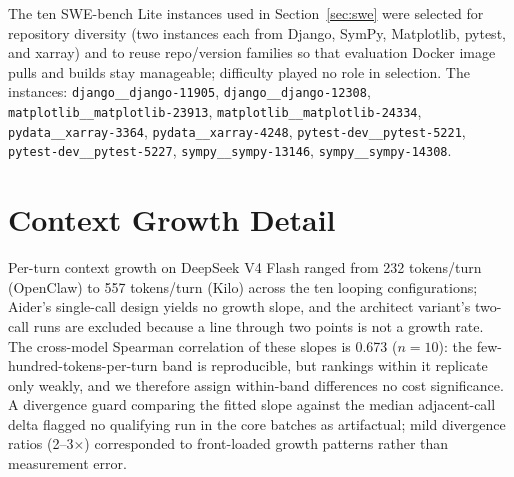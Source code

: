 \documentclass[11pt]{article}
\newcommand{\harness}[1]{\textsf{#1}}
\begin{document}
The ten SWE-bench Lite instances used in Section~\ref{sec:swe} were selected for repository diversity (two instances each from Django, SymPy, Matplotlib, pytest, and xarray) and to reuse repo/version families so that evaluation Docker image pulls and builds stay manageable; difficulty played no role in selection. The instances: \texttt{django\_\_django-11905}, \texttt{django\_\_django-12308}, \texttt{matplotlib\_\_matplotlib-23913}, \texttt{matplotlib\_\_matplotlib-24334}, \texttt{pydata\_\_xarray-3364}, \texttt{pydata\_\_xarray-4248}, \texttt{pytest-dev\_\_pytest-5221}, \texttt{pytest-dev\_\_pytest-5227}, \texttt{sympy\_\_sympy-13146}, \texttt{sympy\_\_sympy-14308}.

\section{Context Growth Detail}
\label{app:growth}

Per-turn context growth on DeepSeek V4 Flash ranged from 232 tokens/turn (\harness{OpenClaw}) to 557 tokens/turn (\harness{Kilo}) across the ten looping configurations; \harness{Aider}'s single-call design yields no growth slope, and the architect variant's two-call runs are excluded because a line through two points is not a growth rate. The cross-model Spearman correlation of these slopes is 0.673 ($n = 10$): the few-hundred-tokens-per-turn band is reproducible, but rankings within it replicate only weakly, and we therefore assign within-band differences no cost significance. A divergence guard comparing the fitted slope against the median adjacent-call delta flagged no qualifying run in the core batches as artifactual; mild divergence ratios (2--3$\times$) corresponded to front-loaded growth patterns rather than measurement error.
\end{document}
